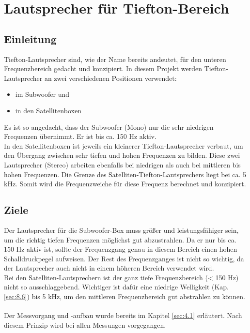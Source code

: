 
\section{Lautsprecher für Tiefton-Bereich} \label{sec:4.2}
\subsection*{Einleitung} \label{subsec:4.2.1}
Tiefton-Lautsprecher sind, wie der Name bereits andeutet, für den unteren Frequenzbereich gedacht und konzipiert.
In diesem Projekt werden Tiefton-Lautsprecher an zwei verschiedenen Positionen verwendet:
\begin{itemize}
	\item im Subwoofer und 
	\item in den Satellitenboxen
\end{itemize}
Es ist so angedacht, dass der Subwoofer (Mono) nur die sehr niedrigen Frequenzen übernimmt.
Er ist bis ca. 150 Hz aktiv.\\
In den Satellitenboxen ist jeweils ein kleinerer Tiefton-Lautsprecher verbaut, um den Übergang zwischen sehr tiefen und hohen Frequenzen zu bilden.
Diese zwei Lautsprecher (Stereo) arbeiten ebenfalls bei niedrigen als auch bei mittleren bis hohen Frequenzen.
Die Grenze des Satelliten-Tiefton-Lautsprechers liegt bei ca. 5 kHz.
Somit wird die Frequenzweiche für diese Frequenz berechnet und konzipiert.

\subsection*{Ziele} \label{subsec:4.2.2}
Der Lautsprecher für die Subwoofer-Box muss größer und leistungsfähiger sein, um die richtig tiefen Frequenzen möglichst gut abzustrahlen.
Da er nur bis ca. 150 Hz aktiv ist, sollte der Frequenzgang genau in diesem Bereich einen hohen Schalldruckpegel aufweisen.
Der Rest des Frequenzganges ist nicht so wichtig, da der Lautsprecher auch nicht in einem höheren Bereich verwendet wird. \\
Bei den Satelliten-Lautsprechern ist der ganz tiefe Frequenzbereich (< 150 Hz) nicht so ausschlaggebend.
Wichtiger ist dafür eine niedrige Welligkeit (Kap. \ref{sec:8.6}) bis 5 kHz, um den mittleren Frequenzbereich gut abstrahlen zu können.\\ \\
Der Messvorgang und -aufbau wurde bereits im Kapitel \ref{sec:4.1} erläutert.
Nach diesem Prinzip wird bei allen Messungen vorgegangen.

